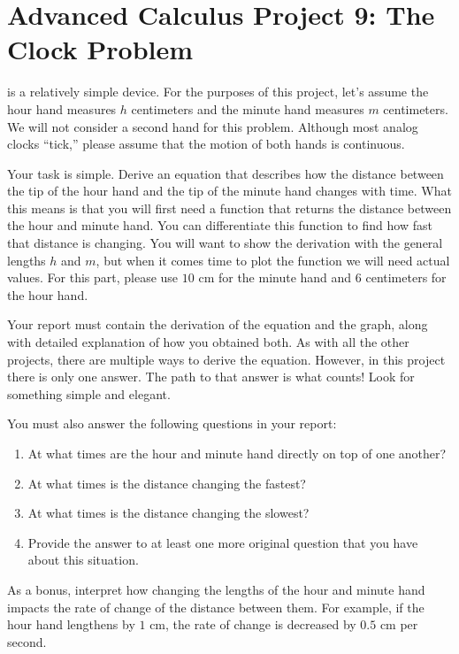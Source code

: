 \documentclass
[justified,nohyper]
{tufte-handout}
\begin{document}
\section{Advanced Calculus Project 9: The Clock Problem}

 is a relatively simple device. For the purposes of this project, let's assume the hour hand measures $h$ centimeters and the minute hand measures $m$ centimeters. We will not consider a second hand for this problem. Although most analog clocks ``tick,'' please assume that the motion of both hands is continuous.

Your task is simple. Derive an equation that describes how the distance between the tip of the hour hand and the tip of the minute hand changes with time. What this means is that you will first need a function that returns the distance between the hour and minute hand. You can differentiate this function to find how fast that distance is changing. You will want to show the derivation with the general lengths $h$ and $m$, but when it comes time to plot the function we will need actual values. For this part, please use $10$ cm for the minute hand and $6$ centimeters for the hour hand.

Your report must contain the derivation of the equation and the graph, along with detailed explanation of how you obtained both. As with all the other projects, there are multiple ways to derive the equation. However, in this project there is only one answer. The path to that answer is what counts! Look for something simple and elegant.

You must also answer the following questions in your report:
\begin{enumerate}
  \item At what times are the hour and minute hand directly on top of one another?
  \item At what times is the distance changing the fastest?
  \item At what times is the distance changing the slowest?
  \item Provide the answer to at least one more original question that you have about this situation.
\end{enumerate}


As a bonus, interpret how changing the lengths of the hour and minute hand impacts the rate of change of the distance between them. For example, if the hour hand lengthens by $1$ cm, the rate of change is decreased by $0.5$ cm per second.
\end{document}
